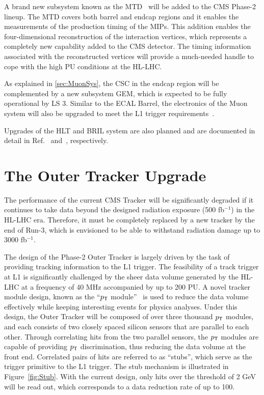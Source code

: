 A brand new subsystem known as the \ac{MTD}~\cite{Butler:2019rpu} will be added to the \ac{CMS} Phase-2 lineup. The \ac{MTD} covers both barrel and endcap regions and it enables the measurements of the production timing of the \acp{MIP}. This addition enables the four-dimensional reconstruction of the interaction vertices, which represents a completely new capability added to the \ac{CMS} detector. The timing information associated with the reconstructed vertices will provide a much-needed handle to cope with the high \ac{PU} conditions at the \ac{HL-LHC}.

As explained in \autoref{sec:MuonSys}, the \ac{CSC} in the endcap region will be complemented by a new subsystem \ac{GEM}, which is expected to be fully operational by \ac{LS} 3. Similar to the \ac{ECAL} Barrel, the electronics of the Muon system will also be upgraded to meet the \ac{L1} trigger requirements~\cite{Hebbeker:2017bix}.

Upgrades of the \ac{HLT} and \ac{BRIL} system are also planned and are documented in detail in Ref.~\cite{HLT:Upgrade} and~\cite{Beam:Upgrade}, respectively. 

\section{The Outer Tracker Upgrade}
\label{sec:OT}

The performance of the current \ac{CMS} Tracker will be significantly degraded if it continues to take data beyond the designed radiation exposure (500 fb$^{-1}$) in the \ac{HL-LHC} era. Therefore, it must be completely replaced by a new tracker by the end of Run-3, which is envisioned to be able to withstand radiation damage up to 3000 fb$^{-1}$. 

The design of the Phase-2 Outer Tracker is largely driven by the task of providing tracking information to the \ac{L1} trigger. The feasibility of a track trigger at \ac{L1} is significantly challenged by the sheer data volume generated by the \ac{HL-LHC} at a frequency of 40 MHz accompanied by up to 200 \ac{PU}. A novel tracker module design, known as the ``$p_{\textsf{T}}$ module''~\cite{Foudas:2005xf} is used to reduce the data volume effectively while keeping interesting events for physics analyses. Under this design, the Outer Tracker will be composed of over three thousand $p_{\textsf{T}}$ modules, and each consists of two closely spaced silicon sensors that are parallel to each other. Through correlating hits from the two parallel sensors, the $p_{\textsf{T}}$ modules are capable of providing $p_{\textsf{T}}$ discrimination, thus reducing the data volume at the front end. Correlated pairs of hits are referred to as ``stubs'', which serve as the trigger primitive to the \ac{L1} trigger. The stub mechanism is illustrated in Figure~\ref{fig:Stub}. With the current design, only hits over the threshold of 2 GeV will be read out, which corresponds to a data reduction rate of up to 100.

